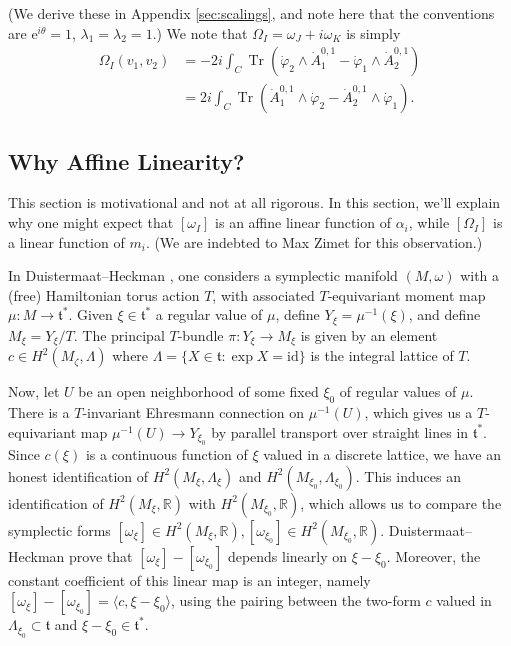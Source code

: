 \documentclass[12pt,letterpaper,reqno]{amsart}
\theoremstyle{remark}
\theoremstyle{definition}
\numberwithin{thm}{section}
\numberwithin{equation}{section}
\numberwithin{figure}{section}
\newcommand{\R}{\ensuremath{\mathbb R}}
\newcommand{\e}{{\mathrm e}}
\newcommand{\IP}[1]{\langle#1\rangle}
\DeclareMathOperator{\Tr}{Tr}
\begin{document}
(We derive these in Appendix \ref{sec:scalings}, and note here that the conventions are $\e^{i \theta}=1$, $\lambda_1=\lambda_2=1$.)
We note that $\Omega_I = \omega_J + i \omega_K$ is simply
\begin{align*}
\Omega_I(v_1,v_2) &= -2i \int_C \Tr \left( \dot \varphi_2 \wedge \dot A_1^{0,1} - \dot \varphi_1 \wedge \dot A_2^{0,1} \right)\\
& = 2i \int_C \Tr \left(   \dot A_1^{0,1} \wedge   \dot \varphi_2  - \dot A_2^{0,1} \wedge  \dot \varphi_1\right).
\end{align*}




\subsection{Why Affine Linearity?} \label{sec:affinelinearity} This section is motivational and not at all rigorous. In this section, we'll explain why one might expect that $[\omega_I]$ is an affine linear function of $\alpha_i$, while $[\Omega_I]$ is a linear function of $m_i$. (We are indebted to Max Zimet for this observation.)


\bigskip


 In Duistermaat--Heckman \cite{DuistermaatHeckman}, one considers a symplectic manifold $(M, \omega)$ with a (free) Hamiltonian torus action $T$, with associated $T$-equivariant moment map $\mu: M \to \mathfrak{t}^*$. 
Given $\xi \in \mathfrak{t}^*$ a regular value of $\mu$, define $Y_\xi= \mu^{-1}(\xi)$, and define $M_\xi = Y_\xi/T$.  The principal $T$-bundle $\pi: Y_\xi \to M_\xi$ is given by an element $c \in H^2(M_\zeta, \Lambda)$ where $\Lambda= \{X \in \mathfrak{t}: \exp X=\mathrm{id}\}$ is the integral lattice of $T$.  

Now, let $U$ be an open neighborhood of some fixed $\xi_0$ of regular values of $\mu$. There is a $T$-invariant Ehresmann connection on $\mu^{-1}(U)$, which gives us a $T$-equivariant map $\mu^{-1}(U) \to Y_{\xi_0}$ by parallel transport over straight lines in $\mathfrak{t}^*$.  Since $c(\xi)$ is a continuous function of $\xi$  valued in a discrete lattice, we have an honest identification of $H^2(M_\xi, \Lambda_\xi)$ and $H^2(M_{\xi_0}, \Lambda_{\xi_0})$. This  induces an identification of $H^2(M_\xi,\R)$ with $H^2(M_{\xi_0}, \R)$, which allows us to compare the symplectic forms $[\omega_\xi] \in H^2(M_{\xi}, \R) , [\omega_{\xi_0}] \in H^2(M_{\xi_0}, \R)$. Duistermaat--Heckman prove that $[\omega_\xi]- [\omega_{\xi_0}]$ depends linearly on $\xi-\xi_0$.
Moreover, the constant coefficient of this linear map is an integer, namely $[\omega_\xi]- [\omega_{\xi_0}] = \IP{c, \xi-\xi_0}$, using the pairing between the two-form $c$ valued in $\Lambda_{\xi_0} \subset \mathfrak{t}$ and $\xi-\xi_0 \in \mathfrak{t}^*$.
\end{document}
